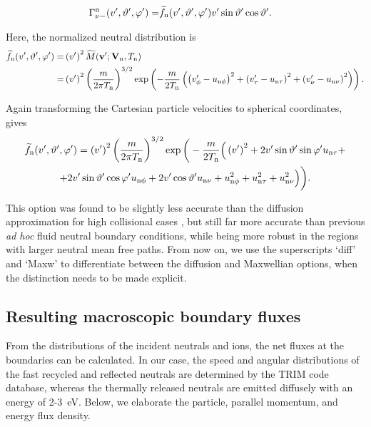 \begin{align}
\Gamma_{\nu -}^{\mathrm{n}}(v',\vartheta',\varphi') =&  \widetilde{f}_{\mathrm{n}}(v',\vartheta',\varphi') v' \sin \vartheta' \cos \vartheta'. \label{eq:Gammanmin_maxw}
\end{align}

Here, the normalized neutral distribution is
\begin{align}
\widetilde{f}_{\mathrm{n}}(v',\vartheta',\varphi') =& \left( v' \right)^{2} \widetilde{M} ({\bf v}';{\bf V}_{\mathrm{n}},T_{\mathrm{n}}) \nonumber \\
=& \left( v' \right)^{2} \left( \frac{m}{2\pi T_{\mathrm{n}}} \right)^{3/2} \exp \left( -\frac{m}{2T_{\mathrm{n}}} \left( \left( v_{\phi}' - u_{\mathrm{n}\phi} \right)^{2} + \left( v_{\tau}' - u_{\mathrm{n}\tau} \right)^{2} + \left( v_{\nu}' - u_{\mathrm{n}\nu} \right)^{2} \right) \right).
\end{align}

Again transforming the Cartesian particle velocities to spherical coordinates, gives
\begin{multline}
\widetilde{f}_{\mathrm{n}}(v',\vartheta',\varphi') = \left (v'\right )^{2} \left (\frac{m}{2\pi T_{\mathrm{n}}}\right )^{3/2} \exp \bigg (-\frac{m}{2T_{\mathrm{n}}} \Big (\left (v'\right )^{2} + 2 v' \sin \vartheta' \sin \varphi' u_{\mathrm{n}\tau} + \\
+ 2 v' \sin \vartheta' \cos \varphi' u_{\mathrm{n}\phi}
+ 2 v' \cos \vartheta' u_{\mathrm{n}\nu} + u_{\mathrm{n}\phi}^{2} + u_{\mathrm{n}\tau}^{2} + u_{\mathrm{n}\nu}^{2} \Big ) \bigg ). \label{eq:fnnorm}
\end{multline}

This option was found to be slightly less accurate than the diffusion approximation for high collisional cases \cite{nf_wim}, but still far more accurate than previous {\it ad hoc} fluid neutral boundary conditions, while being more robust in the regions with larger neutral mean free paths.
From now on, we use the superscripts `diff' and `Maxw' to differentiate between the diffusion and Maxwellian options, when the distinction needs to be made explicit.

\subsection{Resulting macroscopic boundary fluxes} \label{sec:boundaryfluxes}

From the distributions of the incident neutrals and ions, the net fluxes at the boundaries can be calculated. In our case, the speed and angular distributions of the fast recycled and reflected neutrals are determined by the TRIM code database, whereas the thermally released neutrals are emitted diffusely with an energy of 2-3~eV. Below, we elaborate the particle, parallel momentum, and energy flux density.

